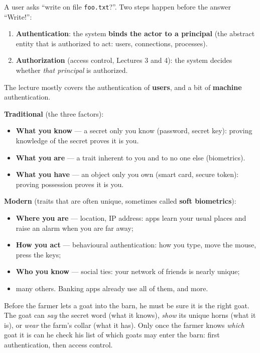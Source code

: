 \begin{defnbox}[title=Where does authentication fit?]
A user asks ``write on file \texttt{foo.txt}?''. Two steps happen before the answer ``Write!'':
\begin{enumerate}
  \item \textbf{Authentication}: the system \textbf{binds the actor to a principal} (the abstract
        entity that is authorized to act: users, connections, processes).
  \item \textbf{Authorization} (access control, Lectures 3 and 4): the system decides whether
        \emph{that principal} is authorized.
\end{enumerate}
The lecture mostly covers the authentication of \textbf{users}, and a bit of \textbf{machine}
authentication.
\end{defnbox}

\begin{defnbox}[title=Ways to prove who you are]
\textbf{Traditional} (the three factors):
\begin{itemize}
  \item \textbf{What you know} --- a secret only you know (password, secret key): proving
        knowledge of the secret proves it is you.
  \item \textbf{What you are} --- a trait inherent to you and to no one else (biometrics).
  \item \textbf{What you have} --- an object only you own (smart card, secure token): proving
        possession proves it is you.
\end{itemize}
\textbf{Modern} (traits that are often unique, sometimes called \textbf{soft biometrics}):
\begin{itemize}
  \item \textbf{Where you are} --- location, IP address: apps learn your usual places and raise an
        alarm when you are far away;
  \item \textbf{How you act} --- behavioural authentication: how you type, move the mouse, press
        the keys;
  \item \textbf{Who you know} --- social ties: your network of friends is nearly unique;
  \item many others. Banking apps already use all of them, and more.
\end{itemize}
\end{defnbox}

\begin{goatbox}
Before the farmer lets a goat into the barn, he must be sure it is the right goat. The goat can
\emph{say} the secret word (what it knows), \emph{show} its unique horns (what it is), or
\emph{wear} the farm's collar (what it has). Only once the farmer knows \emph{which} goat it is can
he check his list of which goats may enter the barn: first authentication, then access control.
\end{goatbox}

